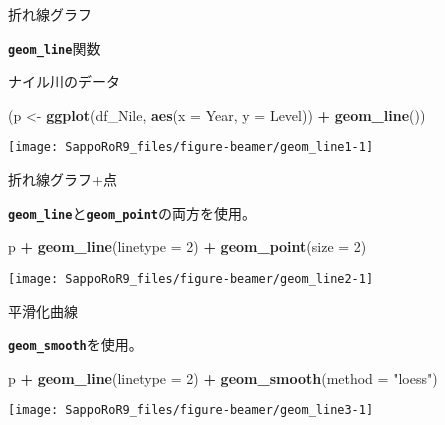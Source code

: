 \documentclass[ignorenonframetext,]{beamer}
\newenvironment{Shaded}{\begin{snugshade}}{\end{snugshade}}
\newcommand{\KeywordTok}[1]{\textcolor[rgb]{0.13,0.29,0.53}{\textbf{#1}}}
\newcommand{\DataTypeTok}[1]{\textcolor[rgb]{0.13,0.29,0.53}{#1}}
\newcommand{\DecValTok}[1]{\textcolor[rgb]{0.00,0.00,0.81}{#1}}
\newcommand{\StringTok}[1]{\textcolor[rgb]{0.31,0.60,0.02}{#1}}
\newcommand{\OperatorTok}[1]{\textcolor[rgb]{0.81,0.36,0.00}{\textbf{#1}}}
\newcommand{\NormalTok}[1]{#1}
\let\oldShaded\Shaded
\let\endoldShaded\endShaded
\renewenvironment{Shaded}{\footnotesize\oldShaded}{\endoldShaded}
\begin{document}
\begin{frame}[fragile]{折れ線グラフ}

\textbf{\texttt{geom\_line}}関数

ナイル川のデータ

\begin{Shaded}
\begin{Highlighting}[]
\NormalTok{(p <-}\StringTok{ }\KeywordTok{ggplot}\NormalTok{(df_Nile, }\KeywordTok{aes}\NormalTok{(}\DataTypeTok{x =}\NormalTok{ Year, }\DataTypeTok{y =}\NormalTok{ Level)) }\OperatorTok{+}\StringTok{ }\KeywordTok{geom_line}\NormalTok{())}
\end{Highlighting}
\end{Shaded}

\texttt{[image: SappoRoR9\_files/figure-beamer/geom\_line1-1]}

\end{frame}

\begin{frame}[fragile]{折れ線グラフ+点}

\textbf{\texttt{geom\_line}}と\textbf{\texttt{geom\_point}}の両方を使用。

\begin{Shaded}
\begin{Highlighting}[]
\NormalTok{p }\OperatorTok{+}\StringTok{ }\KeywordTok{geom_line}\NormalTok{(}\DataTypeTok{linetype =} \DecValTok{2}\NormalTok{) }\OperatorTok{+}\StringTok{ }\KeywordTok{geom_point}\NormalTok{(}\DataTypeTok{size =} \DecValTok{2}\NormalTok{)}
\end{Highlighting}
\end{Shaded}

\texttt{[image: SappoRoR9\_files/figure-beamer/geom\_line2-1]}

\end{frame}

\begin{frame}[fragile]{平滑化曲線}

\textbf{\texttt{geom\_smooth}}を使用。

\begin{Shaded}
\begin{Highlighting}[]
\NormalTok{p }\OperatorTok{+}\StringTok{ }\KeywordTok{geom_line}\NormalTok{(}\DataTypeTok{linetype =} \DecValTok{2}\NormalTok{) }\OperatorTok{+}\StringTok{ }\KeywordTok{geom_smooth}\NormalTok{(}\DataTypeTok{method =} \StringTok{"loess"}\NormalTok{)}
\end{Highlighting}
\end{Shaded}

\texttt{[image: SappoRoR9\_files/figure-beamer/geom\_line3-1]}

\end{frame}
\end{document}

